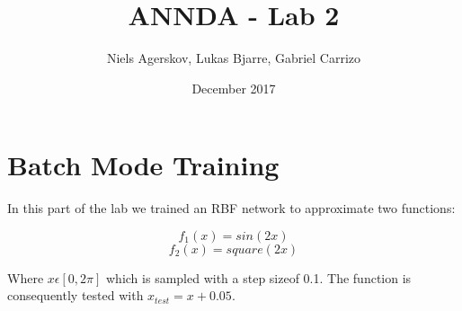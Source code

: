 \documentclass{article}
\title{ANNDA - Lab 2}
\author{Niels Agerskov, Lukas Bjarre, Gabriel Carrizo}
\date{December 2017}
\begin{document}
\maketitle
\pagebreak

\section{Batch Mode Training}

In this part of the lab we trained an RBF network to approximate two functions:

\begin{equation}
  f_1(x) = sin(2x)
\end{equation}
\begin{equation}
  f_2(x) = square(2x)
\end{equation}

Where $x \epsilon [0, 2\pi]$ which is sampled with a step sizeof 0.1. The function is consequently tested with $x_{test} = x+0.05$.
\end{document}
